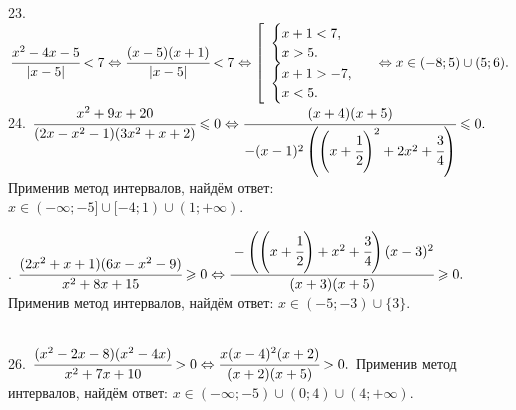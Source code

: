 \documentclass[12pt]{article}
\begin{document}
23. $\cfrac{x^2-4x-5}{|x-5|}<7\Leftrightarrow\cfrac{(x-5)(x+1)}{|x-5|}<7\Leftrightarrow \left[\begin{array}{l} \begin{cases}x+1<7,\\ x>5.\end{cases}\\
\begin{cases}x+1>-7,\\ x<5.\end{cases}\end{array}\right.\Leftrightarrow  x\in (-8;5)\cup(5;6).$\\
24. $\cfrac{x^2+9x+20}{(2x-x^2-1)(3x^2+x+2)}\leqslant0\Leftrightarrow \cfrac{(x+4)(x+5)}{-(x-1)^2\left(\left(x+\cfrac{1}{2}\right)^2+2x^2+\cfrac{3}{4}\right)}\leqslant0.$ Применив метод интервалов, найдём ответ: $x\in
(-\infty;-5]\cup[-4;1)\cup(1;+\infty).$
\begin{figure}[ht!]
\end{figure}\newpage{}. $\cfrac{(2x^2+x+1)(6x-x^2-9)}{x^2+8x+15}\geqslant0\Leftrightarrow \cfrac{-\left(\left(x+\cfrac{1}{2}\right)+x^2+\cfrac{3}{4}\right)(x-3)^2}{(x+3)(x+5)}\geqslant0.$ Применив метод интервалов, найдём ответ: $x\in
(-5;-3)\cup\{3\}.$
\begin{figure}[ht!]
\end{figure}\\
26. $\cfrac{(x^2-2x-8)(x^2-4x)}{x^2+7x+10}>0\Leftrightarrow\cfrac{x(x-4)^2(x+2)}{(x+2)(x+5)}>0.$ Применив метод интервалов, найдём ответ: $x\in
(-\infty;-5)\cup(0;4)\cup(4;+\infty).$
\begin{figure}[ht!]
\end{figure}\\
\end{document}
